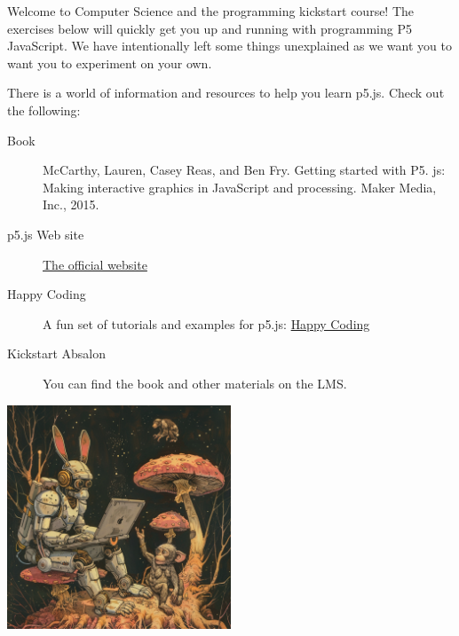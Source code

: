 \documentclass{ucph-handout}
\begin{document}
\begin{exercisebox}[adjusted title=Welcome to Kickstart]
Welcome to Computer Science and the programming kickstart course!
The exercises below will quickly get you up and running with programming P5 JavaScript. We have intentionally left some things unexplained as we want you to want you to experiment on your own.
\end{exercisebox}
\begin{exercisebox}[adjusted title=Resources]
There is a world of information and resources to help you learn p5.js. Check out the following:
\begin{description}
\item[Book] McCarthy, Lauren, Casey Reas, and Ben Fry. Getting started with P5. js: Making interactive graphics in JavaScript and processing. Maker Media, Inc., 2015.
\item[p5.js Web site] \href{https://p5js.org/}{The official website}
\item[Happy Coding] A fun set of tutorials and examples for p5.js: \href{https://happycoding.io/}{Happy Coding}
\item[Kickstart Absalon] You can find the book and other materials on the LMS.
\end{description}
\end{exercisebox}
\begin{exercisebox}[adjusted title=Have Fun]
\begin{center}
\includegraphics[width=0.5\textwidth]{illustrationer/monkey_fun.png}
\end{center}
\end{exercisebox}







\end{document}
